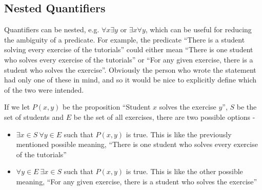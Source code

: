 \subsection*{Nested Quantifiers}

Quantifiers can be nested, e.g. $\forall x \exists y$ or $\exists x \forall y$, which can be useful for reducing the
 ambiguity of a predicate. For example, the predicate ``There is a student solving every exercise of the tutorials''
 could either mean ``There is one student who solves every exercise of the tutorials'' or ``For any given exercise, 
 there is a student who solves the exercise''. Obviously the person who wrote the statement had only one of these in
 mind, and so it would be nice to explicitly define which of the two were intended.

If we let $P(x, y)$ be the proposition ``Student $x$ solves the exercise $y$'', $S$ be the set of students and $E$ be
 the set of all exercises, there are two possible options -
\begin{itemize}
  \item $\exists x \in S\ \forall y \in E$ such that $P(x, y)$ is true. This is like the previously mentioned possible
   meaning, ``There is one student who solves every exercise of the tutorials''
  \item $\forall y \in E\ \exists x \in S$ such that $P(x, y)$ is true. This is like the other possible meaning,
   ``For any given exercise, there is a student who solves the exercise''
\end{itemize}
